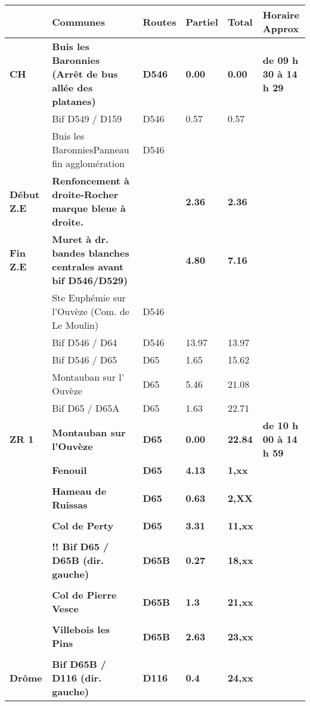 \documentclass{article}%
\begin{document}
\begin{longtable}{p{2.25cm}|p{6.7cm}|p{2.0cm}|p{1.5cm}|p{1.5cm}|p{3.5cm}}%
\hline%
&Communes&Routes&Partiel&Total&Horaire Approx\\%
\hline%
\endhead%
\endfoot%
\endlastfoot%
\textbf{﻿CH}&\textbf{Buis les Baronnies (Arrêt de bus allée des platanes)}&\textbf{D546}&\textbf{0.00}&\textbf{0.00}&\textbf{de 09 h 30 à 14 h 29}\\%
 &Bif D549 / D159 &D546 &0.57&0.57& \\%
 &Buis les BaronniesPanneau fin agglomération&D546& & & \\%
\textbf{Début Z.E}&\textbf{Renfoncement à droite-Rocher marque bleue à droite.}& &\textbf{2.36}&\textbf{2.36}& \\%
\textbf{Fin Z.E}&\textbf{Muret à dr. bandes blanches centrales avant bif D546/D529)}& &\textbf{4.80}&\textbf{7.16}& \\%
 &Ste Euphémie sur l'Ouvèze (Com. de Le Moulin)&D546& & & \\%
 &Bif D546 / D64 &D546&13.97&13.97& \\%
 &Bif D546 / D65&D65 &1.65&15.62& \\%
 &Montauban sur l' Ouvèze &D65&5.46&21.08& \\%
 &Bif D65 / D65A&D65&1.63&22.71& \\%
\textbf{ZR 1}&\textbf{Montauban sur l'Ouvèze}&\textbf{D65}&\textbf{0.00}&\textbf{22.84}&\textbf{de 10 h 00 à 14 h 59}\\%
 &\textbf{Fenouil }&\textbf{D65}&\textbf{4.13}&\textbf{1,xx}& \\%
 & & & & & \\%
 &\textbf{Hameau de Ruissas }&\textbf{D65}&\textbf{0.63}&\textbf{2,XX}& \\%
 & & & & & \\%
 &\textbf{Col de Perty}&\textbf{D65}&\textbf{3.31}&\textbf{11,xx}& \\%
 & & & & & \\%
 &\textbf{!! Bif D65 / D65B (dir. gauche)}&\textbf{D65B}&\textbf{0.27}&\textbf{18,xx}& \\%
 & & & & & \\%
 &\textbf{Col de Pierre Vesce}&\textbf{D65B}&\textbf{1.3}&\textbf{21,xx}& \\%
 & & & & & \\%
\textbf{ }&\textbf{Villebois les Pins}&\textbf{D65B }&\textbf{2.63}&\textbf{23,xx}& \\%
 & & & & & \\%
\textbf{Drôme}&\textbf{Bif D65B / D116 (dir. gauche)}&\textbf{D116}&\textbf{0.4}&\textbf{24,xx}& \\%

\end{longtable}
\end{document}
